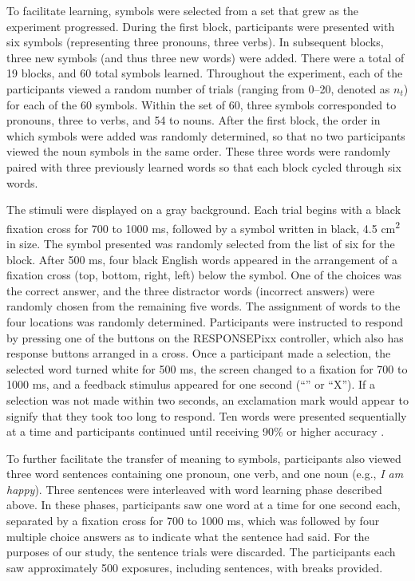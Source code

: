 To facilitate learning, symbols were selected from a set that grew as the experiment progressed. During the first block, participants were presented with six symbols (representing three pronouns, three verbs). In subsequent blocks, three new symbols (and thus three new words) were added. There were a total of 19 blocks, and 60 total symbols learned. Throughout the experiment, each of the participants viewed a random number of trials (ranging from 0--20, denoted as $n_t$) for each of the 60 symbols. Within the set of 60, three symbols corresponded to pronouns, three to verbs, and 54 to nouns. After the first block, the order in which symbols were added was randomly determined, so that no two participants viewed the noun symbols in the same order. These three words were randomly paired with three previously learned words so that each block cycled through six words. 
  
The stimuli were displayed on a gray background.  Each trial begins with a black fixation cross for 700 to 1000 ms, followed by a symbol written in black, 4.5 cm\textsuperscript{2} in size. The symbol presented was randomly selected from the list of six for the block. After 500 ms, four black English words appeared in the arrangement of a fixation cross (top, bottom, right, left) below the symbol. One of the choices was the correct answer, and the three distractor words (incorrect answers) were randomly chosen from the remaining five words. The assignment of words to the four locations was randomly determined. Participants were instructed to respond by pressing one of the buttons on the RESPONSEPixx controller, which also has response buttons arranged in a cross. Once a participant made a selection, the selected word turned white for 500 ms, the screen changed to a fixation for 700 to 1000 ms, and a feedback stimulus appeared for one second (``\CheckmarkBold'' or ``X''). If a selection was not made within two seconds, an exclamation mark would appear to signify that they took too long to respond. Ten words were presented sequentially at a time  and participants continued until receiving 90\% or higher accuracy . 
  
To further facilitate the transfer of meaning to symbols, participants also viewed three word sentences containing one pronoun, one verb, and one noun (e.g., \emph{I am happy}). Three sentences were interleaved with word learning phase described above. In these phases, participants saw one word at a time for one second each, separated by a fixation cross for 700 to 1000 ms, which was followed by four multiple choice answers as to indicate what the sentence had said. For the purposes of our study, the sentence trials were discarded. The participants each saw approximately 500 exposures, including sentences, with breaks provided.
